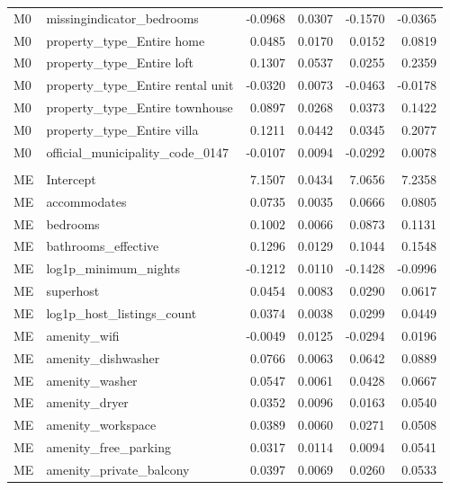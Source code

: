 \begin{landscape}
\begin{longtable}{>{\raggedright\arraybackslash}p{2cm}>{\raggedright\arraybackslash}p{9cm}rrrr}
M0 & missingindicator\_\allowbreak{}bedrooms & -0.0968 & 0.0307 & -0.1570 & -0.0365 \\
M0 & property\_\allowbreak{}type\_\allowbreak{}Entire home & 0.0485 & 0.0170 & 0.0152 & 0.0819 \\
M0 & property\_\allowbreak{}type\_\allowbreak{}Entire loft & 0.1307 & 0.0537 & 0.0255 & 0.2359 \\
M0 & property\_\allowbreak{}type\_\allowbreak{}Entire rental unit & -0.0320 & 0.0073 & -0.0463 & -0.0178 \\
M0 & property\_\allowbreak{}type\_\allowbreak{}Entire townhouse & 0.0897 & 0.0268 & 0.0373 & 0.1422 \\
M0 & property\_\allowbreak{}type\_\allowbreak{}Entire villa & 0.1211 & 0.0442 & 0.0345 & 0.2077 \\
M0 & official\_\allowbreak{}municipality\_\allowbreak{}code\_\allowbreak{}0147 & -0.0107 & 0.0094 & -0.0292 & 0.0078 \\
\addlinespace[0.5em]
\multicolumn{6}{l}{\textbf{ME}} \\
ME & Intercept & 7.1507 & 0.0434 & 7.0656 & 7.2358 \\
ME & accommodates & 0.0735 & 0.0035 & 0.0666 & 0.0805 \\
ME & bedrooms & 0.1002 & 0.0066 & 0.0873 & 0.1131 \\
ME & bathrooms\_\allowbreak{}effective & 0.1296 & 0.0129 & 0.1044 & 0.1548 \\
ME & log1p\_\allowbreak{}minimum\_\allowbreak{}nights & -0.1212 & 0.0110 & -0.1428 & -0.0996 \\
ME & superhost & 0.0454 & 0.0083 & 0.0290 & 0.0617 \\
ME & log1p\_\allowbreak{}host\_\allowbreak{}listings\_\allowbreak{}count & 0.0374 & 0.0038 & 0.0299 & 0.0449 \\
ME & amenity\_\allowbreak{}wifi & -0.0049 & 0.0125 & -0.0294 & 0.0196 \\
ME & amenity\_\allowbreak{}dishwasher & 0.0766 & 0.0063 & 0.0642 & 0.0889 \\
ME & amenity\_\allowbreak{}washer & 0.0547 & 0.0061 & 0.0428 & 0.0667 \\
ME & amenity\_\allowbreak{}dryer & 0.0352 & 0.0096 & 0.0163 & 0.0540 \\
ME & amenity\_\allowbreak{}workspace & 0.0389 & 0.0060 & 0.0271 & 0.0508 \\
ME & amenity\_\allowbreak{}free\_\allowbreak{}parking & 0.0317 & 0.0114 & 0.0094 & 0.0541 \\
ME & amenity\_\allowbreak{}private\_\allowbreak{}balcony & 0.0397 & 0.0069 & 0.0260 & 0.0533 \\

\end{longtable}
\end{landscape}
